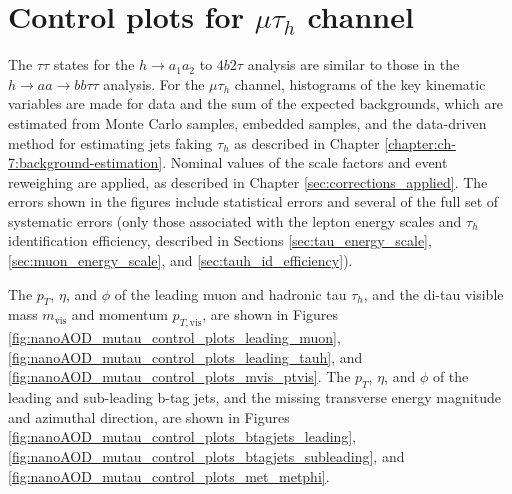 \section{Control plots for \texorpdfstring{$\mu\tau_{h}$}{mutauh} channel}
\label{section:a1a2_control_plots}
The $\tau\tau$ states for the $h \rightarrow a_1 a_2$ to $4b2\tau$ analysis are similar to those in the $h\rightarrow aa \rightarrow bb\tau\tau$ analysis. For the $\mu\tau_{h}$ channel, histograms of the key kinematic variables are made for data and the sum of the expected backgrounds, which are estimated from Monte Carlo samples, embedded samples, and the data-driven method for estimating jets faking $\tau_{h}$ as described in Chapter \ref{chapter:ch-7:background-estimation}. Nominal values of the scale factors and event reweighing are applied, as described in Chapter \ref{sec:corrections_applied}. The errors shown in the figures include statistical errors and several of the full set of systematic errors (only those associated with the lepton energy scales and $\tau_{h}$ identification efficiency, described in Sections \ref{sec:tau_energy_scale}, \ref{sec:muon_energy_scale}, and \ref{sec:tauh_id_efficiency}). 

The $p_{T}$, $\eta$, and $\phi$ of the leading muon and hadronic tau $\tau_{h}$, and the di-tau visible mass $m_{\text{vis}}$ and momentum $p_{T, \text{vis}}$, are shown in Figures \ref{fig:nanoAOD_mutau_control_plots_leading_muon}, \ref{fig:nanoAOD_mutau_control_plots_leading_tauh}, and \ref{fig:nanoAOD_mutau_control_plots_mvis_ptvis}. The $p_{T}$, $\eta$, and $\phi$ of the leading and sub-leading b-tag jets, and the missing transverse energy magnitude and azimuthal direction, are shown in Figures \ref{fig:nanoAOD_mutau_control_plots_btagjets_leading}, \ref{fig:nanoAOD_mutau_control_plots_btagjets_subleading}, and \ref{fig:nanoAOD_mutau_control_plots_met_metphi}.

